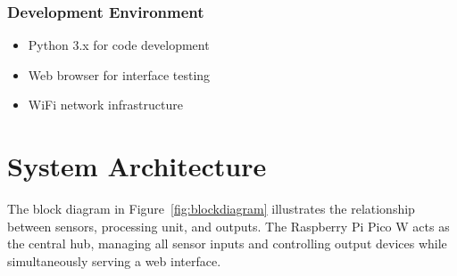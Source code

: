 \documentclass[12pt,a4paper]{article}
\begin{document}
\subsubsection{Development Environment}

\begin{itemize}
\item Python 3.x for code development
\item Web browser for interface testing
\item WiFi network infrastructure
\end{itemize}

\newpage
\section{System Architecture}

The block diagram in Figure~\ref{fig:blockdiagram} illustrates the relationship between sensors, processing unit, and outputs. The Raspberry Pi Pico W acts as the central hub, managing all sensor inputs and controlling output devices while simultaneously serving a web interface.
\end{document}
